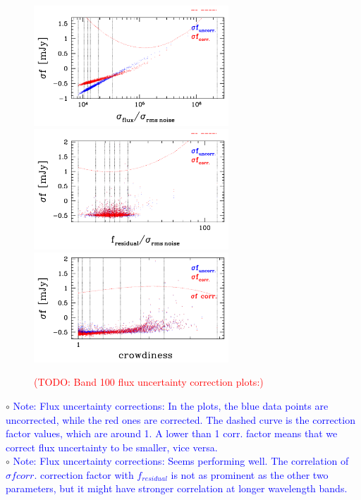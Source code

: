 \documentclass[11pt,a4paper]{article}
\begin{document}
\begin{figure}[H]
	\caption{
		\textcolor{red}{(TODO: Band 100 flux uncertainty correction plots:)}
	}
	\includegraphics[width=0.65\textwidth]{galsim_100_dfcorr_1}
	\includegraphics[width=0.65\textwidth]{galsim_100_dfcorr_2}
	\includegraphics[width=0.65\textwidth]{galsim_100_dfcorr_3}
\end{figure}

\indent\hspace{15pt}$\circ$ 
\textcolor{blue}{Note: Flux uncertainty corrections: In the plots, the blue data points are uncorrected, while the red ones are corrected. The dashed curve is the correction factor values, which are around 1. A lower than 1 corr. factor means that we correct flux uncertainty to be smaller, vice versa. }
\\
\indent\hspace{15pt}$\circ$ 
\textcolor{blue}{Note: Flux uncertainty corrections: Seems performing well. The correlation of $\sigma{f}corr.$ correction factor with $f_{residual}$ is not as prominent as the other two parameters, but it might have stronger correlation at longer wavelength bands.}
\\
\end{document}
